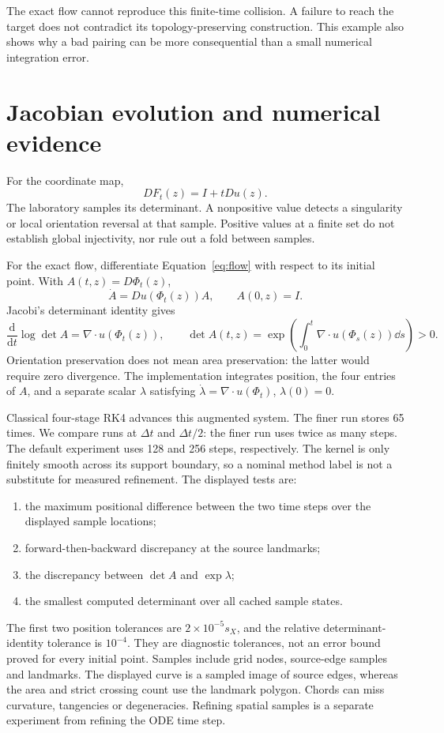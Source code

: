 \documentclass[11pt]{article}
\begin{document}
The exact flow cannot reproduce this finite-time collision. A failure to reach the target does not contradict its topology-preserving construction. This example also shows why a bad pairing can be more consequential than a small numerical integration error.

\section{Jacobian evolution and numerical evidence}\label{sec:diagnostics}
For the coordinate map,
\[
 DF_t(z)=I+tDu(z).
\]
The laboratory samples its determinant. A nonpositive value detects a singularity or local orientation reversal at that sample. Positive values at a finite set do not establish global injectivity, nor rule out a fold between samples.

For the exact flow, differentiate Equation~\eqref{eq:flow} with respect to its initial point. With $A(t,z)=D\Phi_t(z)$,
\begin{equation}\label{eq:variation}
 \dot A=Du(\Phi_t(z))A,\qquad A(0,z)=I.
\end{equation}
Jacobi's determinant identity gives
\[
 \frac{\mathrm d}{\mathrm dt}\log\det A=\nabla\cdot u(\Phi_t(z)),\qquad
 \boxed{\det A(t,z)=\exp\!\left(\int_0^t\nabla\cdot u(\Phi_s(z))\dd s\right)>0.}
\]
Orientation preservation does not mean area preservation: the latter would require zero divergence. The implementation integrates position, the four entries of $A$, and a separate scalar $\lambda$ satisfying $\dot\lambda=\nabla\cdot u(\Phi_t)$, $\lambda(0)=0$.

Classical four-stage RK4 advances this augmented system. The finer run stores 65 times. We compare runs at $\Delta t$ and $\Delta t/2$: the finer run uses twice as many steps. The default experiment uses 128 and 256 steps, respectively. The kernel is only finitely smooth across its support boundary, so a nominal method label is not a substitute for measured refinement. The displayed tests are:
\begin{enumerate}
\item the maximum positional difference between the two time steps over the displayed sample locations;
\item forward-then-backward discrepancy at the source landmarks;
\item the discrepancy between $\det A$ and $\exp\lambda$;
\item the smallest computed determinant over all cached sample states.
\end{enumerate}
The first two position tolerances are $2\times10^{-5}s_X$, and the relative determinant-identity tolerance is $10^{-4}$. They are diagnostic tolerances, not an error bound proved for every initial point. Samples include grid nodes, source-edge samples and landmarks. The displayed curve is a sampled image of source edges, whereas the area and strict crossing count use the landmark polygon. Chords can miss curvature, tangencies or degeneracies. Refining spatial samples is a separate experiment from refining the ODE time step.
\end{document}
